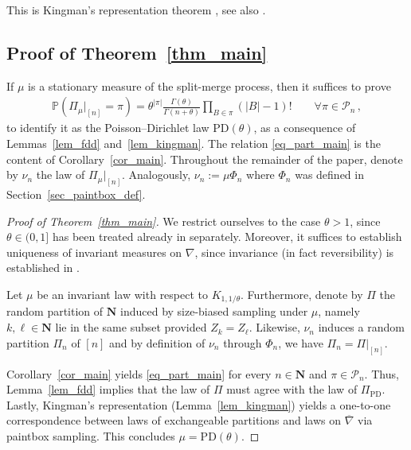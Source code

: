 \documentclass[a4paper,11pt]{article}
\newcommand{\NN}{\mathbf{N}}
\newcommand{\PP}{\mathbb{P}}
\newcommand{\mP}{\mathcal{P}}
\numberwithin{equation}{section}
\begin{document}
This is Kingman's representation theorem \cite{Kingman1978}, see also \cite[Theorem~2.2]{Pitman2006}.




\subsection{Proof of Theorem~\ref{thm_main}}

If $ \mu$ is a stationary measure of the split-merge process, 
then it suffices to prove
\begin{equation}\label{eq_part_main}
\begin{aligned}
\PP ( \Pi_{\mu} |_{[n]} = \pi) = 
\theta^{|\pi|}
\frac{\Gamma ( \theta)}{ \Gamma( n+\theta)} 
\prod_{B \in \pi}(|B|-1)! \qquad \forall \pi \in \mP_{n}\,,
\end{aligned}
\end{equation}
to identify it as the Poisson--Dirichlet law $ \mathrm{PD}( \theta)$, as a consequence of Lemmas~\ref{lem_fdd} and~\ref{lem_kingman}.
The relation \eqref{eq_part_main} is the content of Corollary~\ref{cor_main}.
Throughout the remainder of the paper, denote by $ \nu_{n}$ the law of $ \Pi_{\mu}|_{[n]}$.
Analogously,  $ \nu_{n} := \mu \Phi_{n} $ where $ \Phi_{n}$ was defined in Section~\ref{sec_paintbox_def}.

\begin{proof}[Proof of Theorem~\ref{thm_main}]
We restrict ourselves to the case $ \theta>1$, since $ \theta \in (0,1]$ has been treated already in \cite[Theorem~7.1(b)]{GUW2011} separately.
Moreover, it suffices to establish uniqueness of invariant measures on $ \nabla$, since invariance (in fact reversibility) is established in \cite[Theorem~3(a)]{MWZZ2002}.

Let $ \mu$ be an invariant law with respect to $ K_{1,1/ \theta}$.
Furthermore, denote by $ \Pi $ the random partition of $ \NN$ induced by size-biased sampling under $ \mu$, namely $ k ,\ell \in \NN$ lie in the same subset provided $ Z_{k}= Z_{\ell}$.
Likewise, $ \nu_{n}$ induces a random partition $ \Pi_{n}$ of $[n]$ and by definition of $ \nu_{n}$ through $ \Phi_{n}$, we have $ \Pi_{n} =\Pi |_{[n]}  $.

Corollary~\ref{cor_main} yields \eqref{eq_part_main} for every $n \in \NN$ and $ \pi \in \mP_{n}$.
Thus, Lemma~\ref{lem_fdd} implies that the law of $ \Pi$ must agree with the law of $ \Pi_{\mathrm{PD}}$.
Lastly, 
Kingman's representation (Lemma~\ref{lem_kingman}) yields a one-to-one correspondence between laws of exchangeable partitions and laws on $ \overline\nabla$ via paintbox sampling.
This concludes $ \mu= \mathrm{PD}( \theta)$.
\end{proof}
\end{document}

